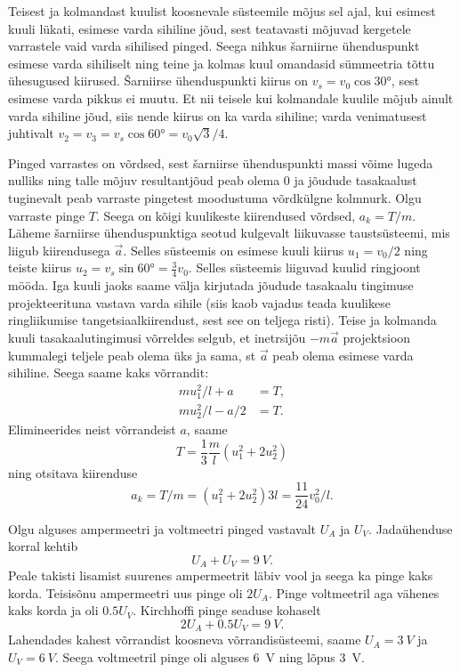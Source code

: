 \documentclass[10pt]{article}
\begin{document}
{
\solu
Teisest ja kolmandast kuulist koosnevale süsteemile mõjus sel ajal, kui esimest kuuli lükati, esimese varda sihiline jõud, sest teatavasti mõjuvad kergetele varrastele vaid varda sihilised pinged. Seega nihkus šarniirne ühenduspunkt esimese varda sihiliselt ning teine ja kolmas kuul omandasid sümmeetria tõttu ühesugused kiirused. Šarniirse ühenduspunkti kiirus on $v_s = v_0 \cos \ang{30}$, sest esimese varda pikkus ei muutu. Et nii teisele kui kolmandale kuulile mõjub ainult varda sihiline jõud, siis nende kiirus on ka varda sihiline; varda venimatusest juhtivalt $v_2 = v_3 = v_s \cos \ang{60} = v_0 \sqrt 3/4$.

Pinged varrastes on võrdsed, sest šarniirse ühenduspunkti massi võime lugeda nulliks ning talle mõjuv resultantjõud peab olema 0 ja jõudude tasakaalust tuginevalt peab varraste pingetest moodustuma võrdkülgne kolmnurk. Olgu varraste pinge $T$. Seega on kõigi kuulikeste kiirendused võrdsed, $a_k = T /m$. Läheme šarniirse ühenduspunktiga seotud kulgevalt liikuvasse taustsüsteemi, mis liigub kiirendusega $\vec a$. Selles süsteemis on esimese kuuli kiirus $u_1 = v_0/2$ ning teiste kiirus $u_2 = v_s \sin \ang{60} = \frac{3}{4} v_0$. Selles süsteemis liiguvad kuulid ringjoont mööda. Iga kuuli jaoks saame välja kirjutada jõudude tasakaalu tingimuse projekteerituna vastava varda sihile (siis kaob vajadus teada kuulikese ringliikumise tangetsiaalkiirendust, sest see on teljega risti). Teise ja kolmanda kuuli tasakaalutingimusi võrreldes selgub, et inetrsijõu $-m\vec a$ projektsioon kummalegi teljele peab olema üks ja sama, st $\vec a$ peab olema esimese varda sihiline. Seega saame kaks võrrandit:
\[
\begin{aligned}
mu_1^2/l + a &= T,\\
mu_2^2/l - a/2 &= T.
\end{aligned}
\]
Elimineerides neist võrrandeist $a$, saame
\[
T=\frac{1}{3} \frac{m}{l}\left(u_{1}^{2}+2 u_2^{2}\right)
\]
ning otsitava kiirenduse
\[
a_{k}=T / m=\left(u_{1}^{2}+2 u_2^{2}\right) 3 l=\frac{11}{24} v_{0}^{2} / l.
\]
\probend
\bigskip


\solu
Olgu alguses ampermeetri ja voltmeetri pinged vastavalt $U_A$ ja $U_V$. Jadaühenduse korral kehtib
\[
U_A + U_V = \SI{9}{V}.
\]
Peale takisti lisamist suurenes ampermeetrit läbiv vool ja seega ka pinge kaks korda. Teisisõnu ampermeetri uus pinge oli $2U_A$. Pinge voltmeetril aga vähenes kaks korda ja oli $\num{0,5}U_V$. Kirchhoffi pinge seaduse kohaselt
\[
2U_A + \num{0,5}U_V = \SI{9}{V}.
\]
Lahendades kahest võrrandist koosneva võrrandisüsteemi, saame $U_A = \SI{3}{V}$ ja $U_V = \SI{6}{V}$. Seega voltmeetril pinge oli alguses \SI{6}{V} ning lõpus \SI{3}{V}.
\probend
\bigskip

}
\end{document}
